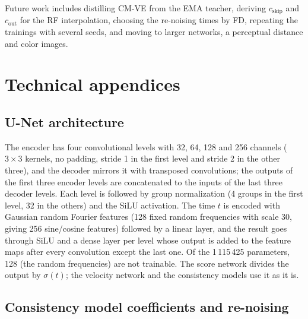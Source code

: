 \documentclass{article}
\begin{document}
Future work includes distilling CM-VE from the EMA teacher, deriving $c_\text{skip}$ and $c_\text{out}$ for the RF
interpolation, choosing the re-noising times by FD, repeating the trainings with
several seeds, and moving to larger networks, a perceptual distance and color
images.

\clearpage
{\small


}

\clearpage
\appendix
\raggedbottom
\section{Technical appendices}
\label{sec:appendix}

\subsection{U-Net architecture}
\label{sec:app_unet}

The encoder has four convolutional levels with 32, 64, 128 and 256 channels
($3\times3$ kernels, no padding, stride 1 in the first level and stride 2 in
the other three), and the decoder mirrors it with transposed convolutions;
the outputs of the first three encoder levels are concatenated to the inputs
of the last three decoder levels. Each level is followed by group
normalization (4 groups in the first level, 32 in the others) and the SiLU
activation. The time $t$ is encoded with Gaussian random Fourier features
(128 fixed random frequencies with scale 30, giving 256 sine/cosine features)
followed by a linear layer, and the result goes through SiLU and a dense layer
per level whose output is added to the feature maps after every convolution
except the last one. Of the 1\,115\,425 parameters, 128 (the random
frequencies) are not trainable. The score network divides the output by
$\sigma(t)$; the velocity network and the consistency models use it as it is.

\subsection{Consistency model coefficients and re-noising}
\label{sec:app_coef}
\end{document}
